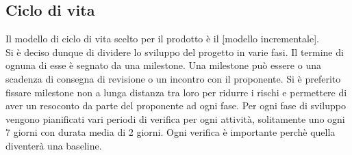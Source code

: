 	\subsection{Ciclo di vita}
		Il modello di ciclo di vita scelto per il prodotto è il \underline[modello incrementale].\\Si è deciso dunque di dividere lo sviluppo del progetto in varie fasi. Il termine di ognuna di esse è segnato da una milestone. Una milestone può essere o una scadenza di consegna di revisione o un incontro con il proponente. Si è preferito fissare milestone non a lunga distanza tra loro per ridurre i rischi e permettere di aver un resoconto da parte del proponente ad ogni fase. Per ogni fase di sviluppo vengono pianificati vari periodi di verifica per ogni attività, solitamente uno ogni 7 giorni con durata media di 2 giorni. Ogni verifica è importante perchè quella diventerà una baseline.

